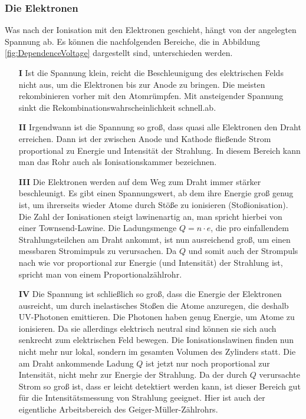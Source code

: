 \subsubsection*{Die Elektronen}
Was nach der Ionisation mit den Elektronen geschieht, hängt von der angelegten Spannung ab. Es können die nachfolgenden Bereiche, die in Abbildung \ref{fig:DependenceVoltage} dargestellt sind, unterschieden werden.
\begin{itemize}
	\item[\textbf{I}] Ist die Spannung klein, reicht die Beschleunigung des elektrischen Felds nicht aus, um die Elektronen bis zur Anode zu bringen. Die meisten rekombinieren vorher mit den Atomrümpfen. Mit ansteigender Spannung sinkt die Rekombinationswahrscheinlichkeit schnell.ab.
	\item[\textbf{II}] Irgendwann ist die Spannung so groß, dass quasi alle Elektronen den Draht erreichen. Dann ist der zwischen Anode und Kathode fließende Strom proportional zu Energie und Intensität der Strahlung. In diesem Bereich kann man das Rohr auch als Ionisationskammer bezeichnen.
	\item[\textbf{III}] Die Elektronen werden auf dem Weg zum Draht immer stärker beschleunigt. Es gibt einen Spannungswert, ab dem ihre Energie groß genug ist, um ihrerseits wieder Atome durch Stöße zu ionisieren (Stoßionisation). Die Zahl der Ionisationen steigt lawinenartig an, man spricht hierbei von einer Townsend-Lawine. Die Ladungsmenge $Q = n\cdot e$, die pro einfallendem Strahlungsteilchen am Draht ankommt, ist nun ausreichend groß, um einen messbaren Stromimpuls zu verursachen. Da $Q$ und somit auch der Strompuls nach wie vor proportional zur Energie (und Intensität) der Strahlung ist, spricht man von einem Proportionalzählrohr.
	\item[\textbf{IV}] Die Spannung ist schließlich so groß, dass die Energie der Elektronen ausreicht, um durch inelastisches Stoßen die Atome anzuregen, die deshalb UV-Photonen emittieren. Die Photonen haben genug Energie, um Atome zu ionisieren. Da sie allerdings elektrisch neutral sind können sie sich auch senkrecht zum elektrischen Feld bewegen. Die Ionisationslawinen finden nun nicht mehr nur lokal, sondern im gesamten Volumen des Zylinders statt. Die am Draht ankommende Ladung $Q$ ist jetzt nur noch proportional zur Intensität, nicht mehr zur Energie der Strahlung. Da der durch $Q$ verursachte Strom so groß ist, dass er leicht detektiert werden kann, ist dieser Bereich gut für die Intensitätsmessung von Strahlung geeignet. Hier ist auch der eigentliche Arbeitsbereich des Geiger-Müller-Zählrohrs.
\end{itemize}
